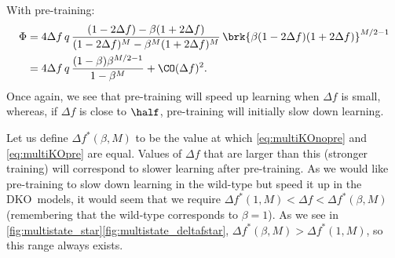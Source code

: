 \documentclass[10pt]{article}
\newcommand{\KO}{DKO}
\begin{document}
With pre-training:
%
\begin{equation}\label{eq:multiKOpre}
\begin{aligned}
  \Phi &= 4{\Delta f}\, q \, \frac{(1-2\Delta f) - \beta(1+2\Delta f)}
          {(1-2\Delta f)^M - \beta^M(1+2\Delta f)^M}   \,
          \brk{\beta (1-2\Delta f) (1+2\Delta f)}^{M/2-1} \\
       &= 4{\Delta f}\, q\,\frac{(1-\beta)\beta^{M/2-1}}{1-\beta^M} + \CO(\Delta f)^2.
\end{aligned}
\end{equation}
%
Once again, we see that pre-training will speed up learning when $\Delta f$ is small, whereas, if $\Delta f$ is close to $\half$, pre-training will initially slow down learning.

Let us define $\Delta f^*(\beta,M)$ to be the value at which \eqref{eq:multiKOnopre} and \eqref{eq:multiKOpre} are equal.
Values of $\Delta f$ that are larger than this (stronger training) will correspond to slower learning after pre-training.
As we would like pre-training to slow down learning in the wild-type but speed it up in the \KO\ models, it would seem that we require $\Delta f^*(1,M) < \Delta f < \Delta f^*(\beta,M)$ (remembering that the wild-type corresponds to $\beta=1$).
As we see in \autoref{fig:multistate_star}\ref{fig:multistate_deltafstar}, $\Delta f^*(\beta,M) > \Delta f^*(1,M)$, so this range always exists.

\end{document}
